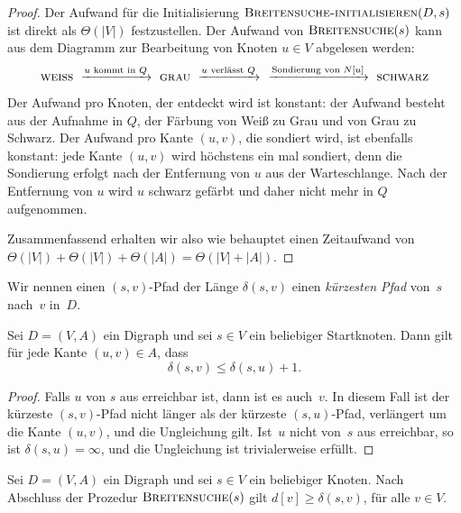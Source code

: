 \begin{proof}
Der Aufwand für die Initialisierung $\mathop{\text{\textsc{Breitensuche-initialisieren}}}(D,s)$ ist direkt als $\Theta(|V|)$ festzustellen. Der Aufwand von $\mathop{\text{\textsc{Breitensuche}}}(s)$ kann aus dem Diagramm zur Bearbeitung von Knoten $u \in V$ abgelesen werden: 
\begin{equation*}
	\cc{weiss} 
	\ \xrightarrow{\text{$u$ kommt in $Q$}} \ 
	 \cc{grau}
	 \  \xrightarrow{\text{$u$ verlässt $Q$}} \ 
	 \ \xrightarrow{\text{Sondierung von $N[u]$}}
	\ \cc{schwarz} 
\end{equation*} 
Der Aufwand pro Knoten, der entdeckt wird ist konstant: der Aufwand  besteht aus der Aufnahme in $Q$,  der Färbung von Weiß zu Grau und von Grau zu Schwarz. Der Aufwand pro Kante $(u,v)$, die sondiert wird, ist ebenfalls konstant: jede Kante $(u,v)$ wird höchstens ein mal sondiert, denn die Sondierung erfolgt nach der Entfernung von $u$ aus der Warteschlange. Nach der Entfernung von $u$ wird $u$ schwarz gefärbt und daher nicht mehr in $Q$ aufgenommen. 

Zusammenfassend erhalten wir also  wie behauptet einen Zeitaufwand von $\Theta(|V|) + \Theta(|V|) + \Theta(|A|) = \Theta(|V|+|A|)$.
\end{proof}


\begin{defn}
Wir nennen einen $(s,v)$-Pfad der Länge $\delta(s,v)$ einen \emph{kürzesten Pfad} von~$s$ nach~$v$ in~$D$.
\end{defn}

\begin{lem}
\label{lem:breitensuche-pfad-dreieck}
Sei $D=(V,A)$ ein Digraph und sei $s \in V$ ein beliebiger Startknoten.
Dann  gilt für jede Kante $(u,v) \in A$, dass
\[
\delta(s,v) \leq \delta(s,u) + 1.
\]
\end{lem}

\begin{proof}
Falls $u$ von $s$ aus erreichbar ist, dann ist es auch~$v$.
In diesem Fall ist der kürzeste $(s,v)$-Pfad nicht länger als der kürzeste $(s,u)$-Pfad, verlängert um die Kante $(u,v)$, und die Ungleichung gilt.
Ist~$u$ nicht von~$s$ aus erreichbar, so ist $\delta(s,u)=\infty$, und die Ungleichung ist trivialerweise erfüllt.
\end{proof}

\begin{lem}
\label{lem:breitensuche-d-geq-delta}
Sei $D=(V,A)$ ein Digraph und sei $s \in V$ ein beliebiger Knoten.
Nach Abschluss der Prozedur $\mathop{\text{\textsc{Breitensuche}}}(s)$ gilt $d[v] \geq \delta(s,v)$, für alle $v \in V$.
\end{lem}

